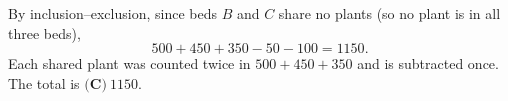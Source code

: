 By inclusion--exclusion, since beds $B$ and $C$ share no plants (so no plant is in all three beds),
\[
500+450+350-50-100=1150 .
\]
Each shared plant was counted twice in $500+450+350$ and is subtracted once. The total is $\boxed{\textbf{(C)}\ 1150}$.

